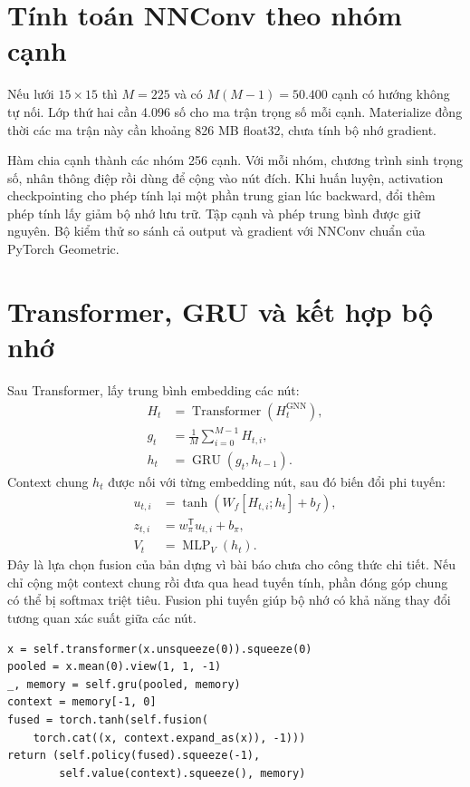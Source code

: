 \documentclass[12pt,a4paper,oneside]{report}
\newcommand{\file}[1]{\texttt{\detokenize{#1}}}
\begin{document}
\section{Tính toán NNConv theo nhóm cạnh}
Nếu lưới $15\times15$ thì $M=225$ và có $M(M-1)=50.400$ cạnh có hướng
không tự nối. Lớp thứ hai cần 4.096 số cho ma trận trọng số mỗi cạnh.
Materialize đồng thời các ma trận này cần khoảng 826 MB float32, chưa
tính bộ nhớ gradient.

Hàm \file{_conv()} chia cạnh thành các nhóm 256 cạnh. Với mỗi nhóm,
chương trình sinh trọng số, nhân thông điệp rồi dùng \file{index_add}
để cộng vào nút đích. Khi huấn luyện, activation checkpointing cho phép
tính lại một phần trung gian lúc backward, đổi thêm phép tính lấy giảm
bộ nhớ lưu trữ. Tập cạnh và phép trung bình được giữ nguyên. Bộ kiểm thử
so sánh cả output và gradient với NNConv chuẩn của PyTorch Geometric.

\section{Transformer, GRU và kết hợp bộ nhớ}
Sau Transformer, lấy trung bình embedding các nút:
\begin{align}
H_t&=\operatorname{Transformer}\left(H_t^{\mathrm{GNN}}\right),\\
g_t&=\frac1M\sum_{i=0}^{M-1}H_{t,i},\\
h_t&=\operatorname{GRU}(g_t,h_{t-1}).
\end{align}
Context chung $h_t$ được nối với từng embedding nút, sau đó biến đổi
phi tuyến:
\begin{align}
u_{t,i}&=\tanh\left(W_f[H_{t,i};h_t]+b_f\right),\\
z_{t,i}&=w_{\pi}^{\mathsf T}u_{t,i}+b_{\pi},\\
V_t&=\operatorname{MLP}_{V}(h_t).
\end{align}
Đây là lựa chọn fusion của bản dựng vì bài báo chưa cho công thức chi
tiết. Nếu chỉ cộng một context chung rồi đưa qua head tuyến tính, phần
đóng góp chung có thể bị softmax triệt tiêu. Fusion phi tuyến giúp bộ
nhớ có khả năng thay đổi tương quan xác suất giữa các nút.

\begin{lstlisting}[caption={Luồng forward sau hai lớp NNConv}]
x = self.transformer(x.unsqueeze(0)).squeeze(0)
pooled = x.mean(0).view(1, 1, -1)
_, memory = self.gru(pooled, memory)
context = memory[-1, 0]
fused = torch.tanh(self.fusion(
    torch.cat((x, context.expand_as(x)), -1)))
return (self.policy(fused).squeeze(-1),
        self.value(context).squeeze(), memory)
\end{lstlisting}
\end{document}
